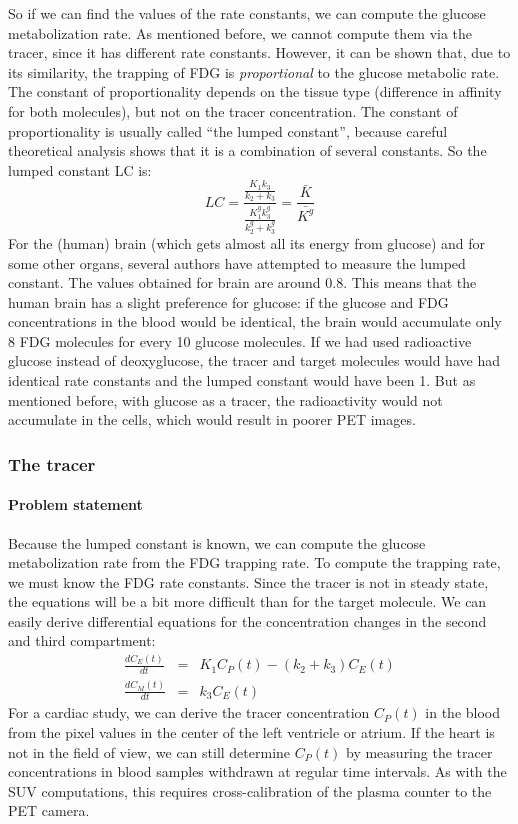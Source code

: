 So if we can find the values of the rate constants, we can compute the glucose
metabolization rate. As mentioned before, we cannot compute them via the
tracer, since it has different rate constants. However, it can be shown that,
due to its similarity, the trapping of FDG is {\em proportional} to the glucose
metabolic rate. The constant of proportionality depends on the tissue type
(difference in affinity for both molecules), but not on the tracer
concentration. The constant of proportionality is usually called ``the lumped
constant'', because careful theoretical analysis shows that it is a combination
of several constants. So the lumped constant LC is:
\begin{equation}
  LC = \frac{\frac{K_1 k_3}{k_2 + k_3}}{\frac{K_1^g k_3^g}{k_2^g + k_3^g}}
  = \frac{\bar{K}}{\bar{K^g}}
\end{equation}
For the (human) brain (which gets almost all its energy from glucose)
and for some other organs, several authors have attempted to measure
the lumped constant. The values obtained for brain are around
0.8. This means that the human brain has a slight preference for
glucose: if the glucose and FDG concentrations in the blood would be
identical, the brain would accumulate only 8 FDG molecules for every
10 glucose molecules. If we had used radioactive glucose instead of
deoxyglucose, the tracer and target molecules would have had identical
rate constants and the lumped constant would have been 1. But as
mentioned before, with glucose as a tracer, the radioactivity would
not accumulate in the cells, which would result in poorer PET images.

\subsubsection{The tracer}
\paragraph{Problem statement\\}
Because the lumped constant is known, we can compute the glucose
metabolization rate from the FDG trapping rate. To compute the trapping rate,
we must know the FDG rate constants. Since the tracer is not in steady state,
the equations will be a bit more difficult than for the target molecule.  We
can easily derive differential equations for the concentration changes in the
second and third compartment:
\begin{eqnarray}
  \frac{dC_E(t)}{dt} & = & K_1 C_P(t) - (k_2 + k_3) C_E(t) \label{eq:C_E}\\
  \frac{dC_M(t)}{dt} & = & k_3 C_E(t) \label{eq:C_M}
\end{eqnarray}
For a cardiac study, we can derive the tracer concentration $C_P(t)$ in the
blood from the pixel values in the center of the left ventricle or atrium. If
the heart is not in the field of view, we can still determine $C_P(t)$ by
measuring the tracer concentrations in blood samples withdrawn at regular time
intervals.  As with the SUV computations, this requires cross-calibration of
the plasma counter to the PET camera.

